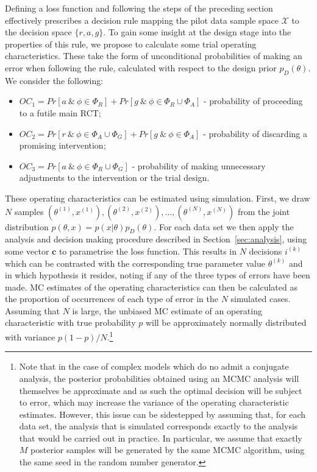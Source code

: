 \documentclass[AMA,STIX1COL]{WileyNJD-v2}
\begin{document}
Defining a loss function and following the steps of the preceding section effectively prescribes a decision rule mapping the pilot data sample space $\mathcal{X}$ to the decision space $\{r, a, g\}$. To gain some insight at the design stage into the properties of this rule, we propose to calculate some trial operating characteristics. These take the form of unconditional probabilities of making an error when following the rule, calculated with respect to the design prior $p_D(\theta)$. We consider the following:
\begin{itemize}
\item $OC_1 = Pr[a ~\&~ \phi \in \Phi_R] + Pr[g ~\&~ \phi \in \Phi_R \cup \Phi_A]$ - probability of proceeding to a futile main RCT;
\item $OC_2 = Pr[r ~\&~ \phi \in \Phi_A \cup \Phi_G] + Pr[g ~\&~ \phi \in \Phi_A]$ - probability of discarding a promising intervention;
\item $OC_3 = Pr[a ~\&~ \phi \in \Phi_R \cup \Phi_G]$ - probability of making unnecessary adjustments to the intervention or the trial design.
\end{itemize}

These operating characteristics can be estimated using simulation. First, we draw $N$ samples $(\theta^{(1)}, x^{(1)}), (\theta^{(2)}, x^{(2)}), \ldots , (\theta^{(N)}, x^{(N)})$ from the joint distribution $p(\theta, x) = p(x | \theta)p_D(\theta)$. For each data set we then apply the analysis and decision making procedure described in Section~\ref{sec:analysis}, using some vector $\mathbf{c}$ to parametrise the loss function. This results in $N$ decisions $i^{(k)}$ which can be contrasted with the corresponding true parameter value $\theta^{(k)}$ and in which hypothesis it resides, noting if any of the three types of errors have been made. MC estimates of the operating characteristics can then be calculated as the proportion of occurrences of each type of error in the $N$ simulated cases. Assuming that $N$ is large, the unbiased MC estimate of an operating characteristic with true probability $p$ will be approximately normally distributed with variance $p(1-p)/N$.\footnote{Note that in the case of complex models which do no admit a conjugate analysis, the posterior probabilities obtained using an MCMC analysis will themselves be approximate and as such the optimal decision will be subject to error, which may increase the variance of the operating characteristic estimates. However, this issue can be sidestepped by assuming that, for each data set, the analysis that is simulated corresponds exactly to the analysis that would be carried out in practice. In particular, we assume that exactly $M$ posterior samples will be generated by the same MCMC algorithm, using the same seed in the random number generator.}
\end{document}

